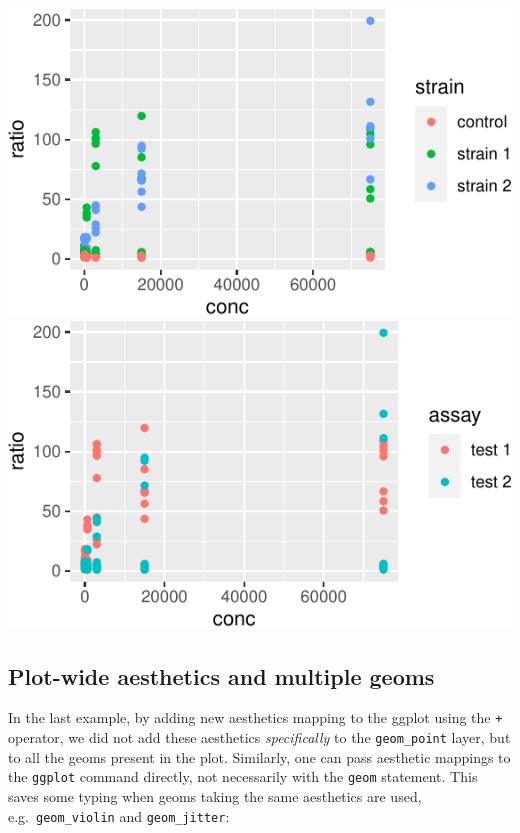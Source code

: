 \documentclass[]{book}
\begin{document}
\begin{center}\includegraphics[width=\textwidth]{TRES-Tidy-Tutorial_files/figure-latex/unnamed-chunk-121-1} \includegraphics[width=\textwidth]{TRES-Tidy-Tutorial_files/figure-latex/unnamed-chunk-121-2} \end{center}

\hypertarget{plot-wide-aesthetics-and-multiple-geoms}{%
\subsection{Plot-wide aesthetics and multiple geoms}\label{plot-wide-aesthetics-and-multiple-geoms}}

In the last example, by adding new aesthetics mapping to the ggplot using the \texttt{+} operator, we did not add these aesthetics \emph{specifically} to the \texttt{geom\_point} layer, but to all the geoms present in the plot. Similarly, one can pass aesthetic mappings to the \texttt{ggplot} command directly, not necessarily with the \texttt{geom} statement. This saves some typing when geoms taking the same aesthetics are used, e.g.~\texttt{geom\_violin} and \texttt{geom\_jitter}:
\end{document}
